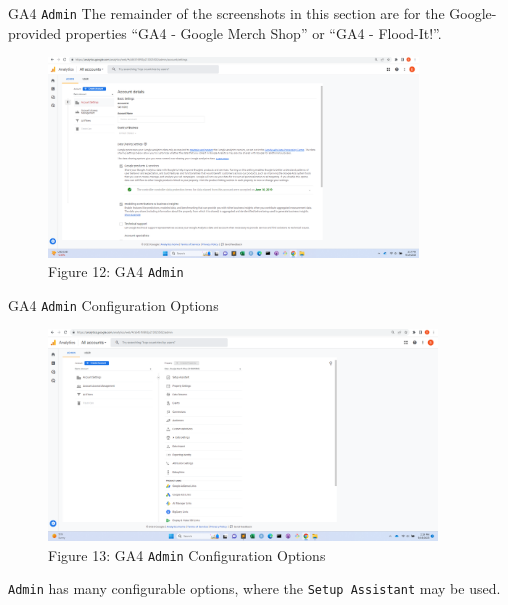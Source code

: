 \documentclass[pdf]{beamer}
\theoremstyle{remark}
\theoremstyle{definition}
\begin{document}
\begin{frame}[t]{GA4 \texttt{Admin}}
The remainder of the screenshots in this section are for the Google-provided properties ``GA4 - Google Merch Shop'' or ``GA4 - Flood-It!''. 
\begin{figure}[htbp]
  \captionsetup{justification=centering}
  \includegraphics[height=5.3cm, trim=1.5cm 0.0cm 2.0cm 0.0cm width=5.6cm]{Images/GA4_5_091923_Admin.png}
  \caption{Figure {\color{franklinblue} 12}: GA4 \texttt{Admin}}
\end{figure}
\end{frame}

\begin{frame}[t]{GA4 \texttt{Admin} Configuration Options}
\begin{figure}[htbp]
  \captionsetup{justification=centering}
  \includegraphics[height=5.6cm, trim=1.5cm 0.0cm 2.0cm 0.0cm width=5.6cm]{Images/GA4_4_091923_Admin.png}
  \caption{Figure {\color{franklinblue} 13}: GA4 \texttt{Admin} Configuration Options}
\end{figure}
\vspace{-2.0ex}
\texttt{Admin} has many configurable options, where the \texttt{Setup Assistant} may be used.  
\end{frame}
\end{document}
